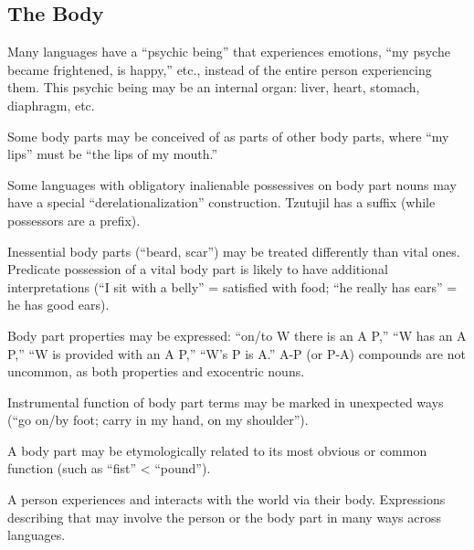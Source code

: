 \documentclass[11pt]{article}
\begin{document}
\subsection{The Body}
Many languages have a ``psychic being'' that experiences emotions,
``my psyche became frightened, is happy,'' etc., instead of the entire
person experiencing them.  This psychic being may be an internal
organ: liver, heart, stomach, diaphragm, etc.

Some body parts may be conceived of as parts of other body parts,
where ``my lips'' must be ``the lips of my mouth.''

Some languages with obligatory inalienable possessives on body part
nouns may have a special ``derelationalization'' construction.
Tzutujil has a suffix (while possessors are a prefix).

Inessential body parts (``beard, scar'') may be treated differently
than vital ones.  Predicate possession of a vital body part is likely
to have additional interpretations (``I sit with a belly'' = satisfied
with food; ``he really has ears'' = he has good ears).

Body part properties may be expressed: ``on/to W there is an A P,''
``W has an A P,'' ``W is provided with an A P,'' ``W's P is A.''  A-P
(or P-A) compounds are not uncommon, as both properties and exocentric
nouns. 

Instrumental function of body part terms may be marked in unexpected
ways (``go on/by foot; carry in my hand, on my shoulder'').

A body part may be etymologically related to its most obvious or
common function (such as ``fist'' < ``pound'').

A person experiences and interacts with the world via their body.
Expressions describing that may involve the person or the body part in
many ways across languages.
\end{document}
